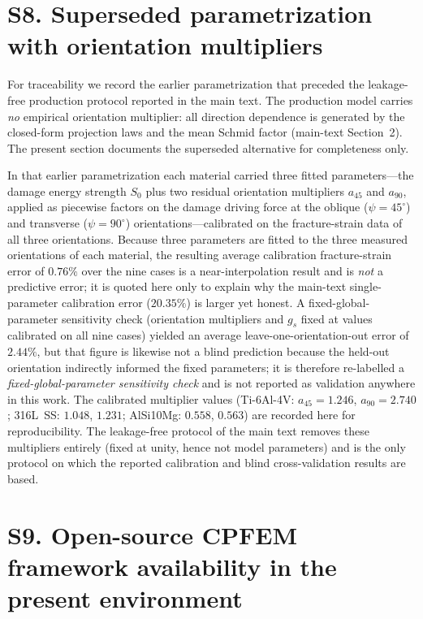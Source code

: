 \documentclass[11pt,a4paper,twocolumn]{article}
\begin{document}
\section*{S8. Superseded parametrization with orientation multipliers}

For traceability we record the earlier parametrization that preceded the leakage-free production protocol reported in the main text. The production model carries \emph{no} empirical orientation multiplier: all direction dependence is generated by the closed-form projection laws and the mean Schmid factor (main-text Section~2). The present section documents the superseded alternative for completeness only.

In that earlier parametrization each material carried three fitted parameters---the damage energy strength $S_0$ plus two residual orientation multipliers $a_{45}$ and $a_{90}$, applied as piecewise factors on the damage driving force at the oblique ($\psi=45^\circ$) and transverse ($\psi=90^\circ$) orientations---calibrated on the fracture-strain data of all three orientations. Because three parameters are fitted to the three measured orientations of each material, the resulting average calibration fracture-strain error of $0.76\%$ over the nine cases is a near-interpolation result and is \emph{not} a predictive error; it is quoted here only to explain why the main-text single-parameter calibration error ($20.35\%$) is larger yet honest. A fixed-global-parameter sensitivity check (orientation multipliers and $g_s$ fixed at values calibrated on all nine cases) yielded an average leave-one-orientation-out error of $2.44\%$, but that figure is likewise not a blind prediction because the held-out orientation indirectly informed the fixed parameters; it is therefore re-labelled a \emph{fixed-global-parameter sensitivity check} and is not reported as validation anywhere in this work. The calibrated multiplier values (Ti-6Al-4V: $a_{45}=1.246$, $a_{90}=2.740$; 316L~SS: $1.048$, $1.231$; AlSi10Mg: $0.558$, $0.563$) are recorded here for reproducibility. The leakage-free protocol of the main text removes these multipliers entirely (fixed at unity, hence not model parameters) and is the only protocol on which the reported calibration and blind cross-validation results are based.

\section*{S9. Open-source CPFEM framework availability in the present environment}
\end{document}
